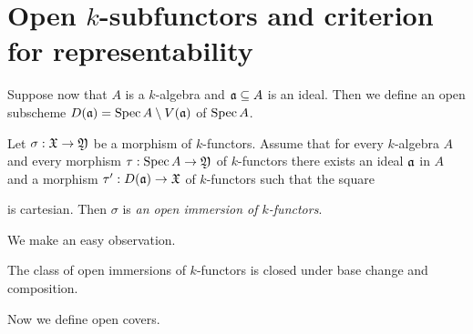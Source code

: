 \section{Open $k$-subfunctors and criterion for representability}
\noindent
Suppose now that $A$ is a $k$-algebra and $\mathfrak{a}\subseteq A$ is an ideal. Then we define an open subscheme $D(\mathfrak{a}) = \mathrm{Spec}\, A\setminus V(\mathfrak{a})$ of $\mathrm{Spec}\, A$.

\begin{definition}
Let $\sigma:{\mathfrak X}\rightarrow {\mathfrak Y}$ be a morphism of $k$-functors. Assume that for every $k$-algebra $A$ and every morphism $\tau:\mathrm{Spec}\, A \rightarrow {\mathfrak Y}$ of $k$-functors there exists an ideal $\mathfrak{a}$ in $A$ and a morphism $\tau':D(\mathfrak{a})\rightarrow {\mathfrak X}$ of $k$-functors such that the square
\begin{center}
\end{center}
is cartesian. Then $\sigma$ is \textit{an open immersion of $k$-functors}.
\end{definition}
\noindent
We make an easy observation.

\begin{fact}\label{fact:open_immersions_are_closed_under_base_change_and_composition}
The class of open immersions of $k$-functors is closed under base change and composition.
\end{fact}
\noindent
Now we define open covers.

